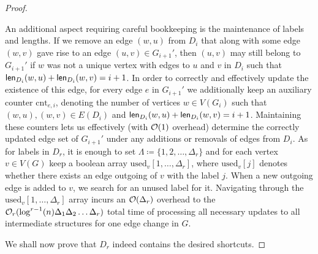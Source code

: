 \begin{proof}
\begin{claimproof}
		An additional aspect requiring careful bookkeeping is the maintenance of labels and lengths. If we remove an edge $(w, u)$ from $D_i$ that along with some edge $(w, v)$  gave rise to an edge $(u, v) \in G_{i+1}'$, then $(u, v)$ may still belong to $G_{i+1}'$ if $w$ was not a unique vertex with edges to $u$ and $v$ in $D_i$ such that $\mathsf{len}_{D_i}(w, u)+\mathsf{len}_{D_i}(w, v)=i+1$. In order to correctly and effectively update the existence of this edge, for every edge $e$ in $G_{i+1}'$ we additionally keep an auxiliary counter $\mathrm{cnt}_{e, i}$, denoting the number of vertices $w \in V(G_i)$ such that $(w, u), (w, v) \in E(D_i)$ and $\mathsf{len}_{D_i}(w, u) + \mathsf{len}_{D_i}(w, v) = i+1$. Maintaining these counters lets us effectively (with $\mathcal{O}(1)$ overhead) determine the correctly updated edge set of $G_{i+1}'$ under any additions or removals of edges from $D_i$. As for labels in $D_r$, it is enough to set $\Lambda \coloneqq \{1, 2, \ldots, \Delta_r\}$ and for each vertex $v \in V(G)$ keep a boolean array $\mathrm{used}_v[1,\ldots,\Delta_r]$, where $\mathrm{used}_v[j]$ denotes whether there exists an edge outgoing of $v$ with the label $j$. When a new outgoing edge is added to $v$, we search for an unused label for it. Navigating through the $\mathrm{used}_v[1,\ldots,\Delta_r]$ array incurs an $\mathcal{O}(\Delta_r)$ overhead to the  $\mathcal{O}_r(\log^{r-1}(n) \Delta_1 \Delta_2 \ldots \Delta_r)$ total time of processing all necessary updates to all intermediate structures for one edge change in $G$.
	\end{claimproof}
	
	We  shall now prove that $D_r$ indeed contains the desired shortcuts.
	

\end{proof}

